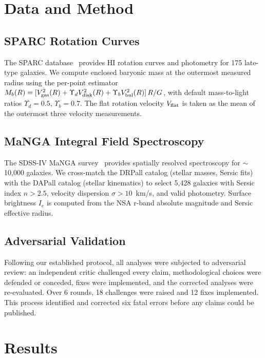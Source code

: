 \documentclass[twocolumn]{aastex631}
\begin{document}
\section{Data and Method}

\subsection{SPARC Rotation Curves}

The SPARC database~\cite{lelli2016} provides HI rotation curves and
photometry for 175 late-type galaxies.  We compute enclosed baryonic
mass at the outermost measured radius using the per-point estimator
$M_b(R) = [V_{\rm gas}^2(R) + \Upsilon_d V_{\rm disk}^2(R) +
\Upsilon_b V_{\rm bul}^2(R)]\,R/G$, with default mass-to-light ratios
$\Upsilon_d=0.5$, $\Upsilon_b=0.7$.  The flat rotation velocity
$V_{\rm flat}$ is taken as the mean of the outermost three velocity
measurements.

\subsection{MaNGA Integral Field Spectroscopy}

The SDSS-IV MaNGA survey~\cite{bundy2015} provides spatially resolved
spectroscopy for $\sim$10,000 galaxies.  We cross-match the DRPall
catalog (stellar masses, Sersic fits) with the DAPall catalog
(stellar kinematics) to select 5,428 galaxies with Sersic index
$n>2.5$, velocity dispersion $\sigma > 10$~km/s, and valid
photometry.  Surface brightness $I_e$ is computed from the NSA r-band
absolute magnitude and Sersic effective radius.

\subsection{Adversarial Validation}

Following our established protocol, all analyses were subjected to
adversarial review: an independent critic challenged every claim,
methodological choices were defended or conceded, fixes were
implemented, and the corrected analyses were re-evaluated.  Over 6
rounds, 18 challenges were raised and 12 fixes implemented.  This
process identified and corrected six fatal errors before any claims
could be published.

\section{Results}
\end{document}

